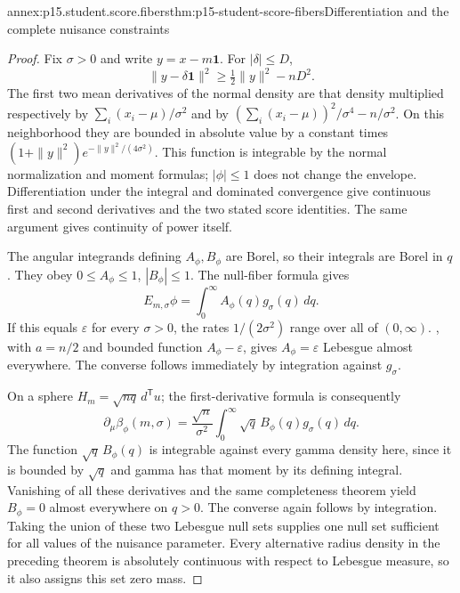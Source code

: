 \begin{annexitem}{annex:p15.student.score.fibers}{thm:p15-student-score-fibers}{Differentiation and the complete nuisance constraints}
\begin{proof}
Fix \(\sigma>0\) and write \(y=x-m\mathbf1\).
For \(|\delta|\leq D\),
\[
  \|y-\delta\mathbf1\|^2
             \geq \tfrac12\|y\|^2-nD^2.
\]
The first two mean derivatives of the normal
density are that density multiplied respectively
by \(\sum_i(x_i-\mu)/\sigma^2\) and by
\((\sum_i(x_i-\mu))^2/\sigma^4-n/\sigma^2\).
On this neighborhood they are bounded in absolute
value by a constant times
\((1+\|y\|^2)e^{-\|y\|^2/(4\sigma^2)}\).
This function is integrable by the normal
normalization and moment formulas; \(|\phi|\leq1\)
does not change the envelope.
Differentiation under the integral and dominated
convergence give continuous first and second
derivatives and the two stated score identities.
The same argument gives continuity of power itself.

The angular integrands defining \(A_\phi,B_\phi\)
are Borel, so their integrals are Borel in \(q\).
They obey \(0\leq A_\phi\leq1\), \(|B_\phi|\leq1\).
The null-fiber formula gives
\[
        E_{m,\sigma}\phi
                         =\int_0^\infty A_\phi(q)g_\sigma(q)\,dq.
\]
If this equals \(\varepsilon\) for every
\(\sigma>0\), the rates \(1/(2\sigma^2)\) range
over all of \((0,\infty)\).
,
with \(a=n/2\) and bounded function
\(A_\phi-\varepsilon\), gives
\(A_\phi=\varepsilon\) Lebesgue almost everywhere.
The converse follows immediately by integration
against \(g_\sigma\).

On a sphere \(H_m=\sqrt{nq}\,d^{\mathsf T}u\);
the first-derivative formula is consequently
\[
       \partial_\mu\beta_\phi(m,\sigma)
        =\frac{\sqrt n}{\sigma^2}
              \int_0^\infty \sqrt q\,B_\phi(q)g_\sigma(q)\,dq.
\]
The function \(\sqrt q\,B_\phi(q)\) is integrable
against every gamma density here, since it is
bounded by \(\sqrt q\) and gamma has that moment
by its defining integral.
Vanishing of all these derivatives and the
same completeness theorem yield \(B_\phi=0\)
almost everywhere on \(q>0\).
The converse again follows by integration.
Taking the union of these two Lebesgue null sets
supplies one null set sufficient for all values
of the nuisance parameter. Every alternative
radius density in the preceding theorem is
absolutely continuous with respect to Lebesgue
measure, so it also assigns this set zero mass.


\end{proof}
\end{annexitem}
